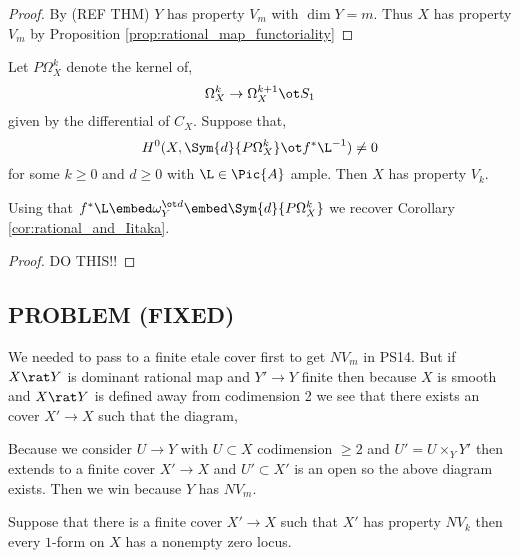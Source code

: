 \documentclass[12pt]{article}
\begin{document}
\begin{proof}
By (REF THM) $Y$ has property $V_m$ with $\dim{Y} = m$. Thus $X$ has property $V_m$ by Proposition \ref{prop:rational_map_functoriality}
\end{proof}

\begin{theorem}
Let $P \Omega^k_X$ denote the kernel of,
\[ \Omega^k_X \to \Omega^{k+1}_X \ot S_1 \]
given by the differential of $C_X$. Suppose that,
\[ H^0(X, \Sym{d}{P \Omega^k_X} \ot f^* \L^{-1}) \neq 0 \]
for some $k \ge 0$ and $d \ge 0$ with $\L \in \Pic{A}$ ample. Then $X$ has property $V_k$. 
\end{theorem}

\begin{rmk}
Using that $f^* \L \embed \omega_Y^{\ot d} \embed \Sym{d}{P \Omega^k_X}$ we recover Corollary \ref{cor:rational_and_Iitaka}. 
\end{rmk}

\begin{proof}
DO THIS!!
\end{proof}

\subsection{PROBLEM (FIXED)}

We needed to pass to a finite etale cover first to get $NV_m$ in PS14. But if $X \rat Y$ is dominant rational map and $Y' \to Y$ finite \etale then because $X$ is smooth and $X \rat Y$ is defined away from codimension 2 we see that there exists an \etale cover $X' \to X$ such that the diagram,
\begin{center}
\end{center}
Because we consider $U \to Y$ with $U \subset X$ codimension $\ge 2$ and $U' = U \times_Y Y'$ then extends to a finite \etale cover $X' \to X$ and $U' \subset X'$ is an open so the above diagram exists.
Then we win because $Y$ has $NV_m$.

\begin{prop}
Suppose that there is a finite \etale cover $X' \to X$ such that $X'$ has property $NV_k$ then every $1$-form on $X$ has a nonempty zero locus.
\end{prop}
\end{document}
